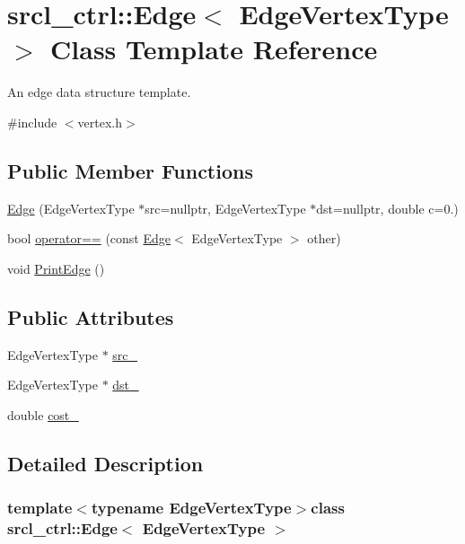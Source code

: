 \hypertarget{classsrcl__ctrl_1_1Edge}{\section{srcl\-\_\-ctrl\-:\-:Edge$<$ Edge\-Vertex\-Type $>$ Class Template Reference}
\label{classsrcl__ctrl_1_1Edge}
}


An edge data structure template.  




{\ttfamily \#include $<$vertex.\-h$>$}

\subsection*{Public Member Functions}
\begin{DoxyCompactItemize}
\item 
\hyperlink{classsrcl__ctrl_1_1Edge_adc7672a9601379eefdf19b87391c4e46}{Edge} (Edge\-Vertex\-Type $\ast$src=nullptr, Edge\-Vertex\-Type $\ast$dst=nullptr, double c=0.)
\item 
bool \hyperlink{classsrcl__ctrl_1_1Edge_aac720de96b34c8df1630a8daf6c1c5f0}{operator==} (const \hyperlink{classsrcl__ctrl_1_1Edge}{Edge}$<$ Edge\-Vertex\-Type $>$ other)
\item 
void \hyperlink{classsrcl__ctrl_1_1Edge_aa4298ece2dc8531478831e9a4264e259}{Print\-Edge} ()
\end{DoxyCompactItemize}
\subsection*{Public Attributes}
\begin{DoxyCompactItemize}
\item 
Edge\-Vertex\-Type $\ast$ \hyperlink{classsrcl__ctrl_1_1Edge_a5bed55147bff722c87024125ce1f9342}{src\-\_\-}
\item 
Edge\-Vertex\-Type $\ast$ \hyperlink{classsrcl__ctrl_1_1Edge_a4056e34b3a064ff9a9b911403c6ea2fc}{dst\-\_\-}
\item 
double \hyperlink{classsrcl__ctrl_1_1Edge_a7371601eee959a3b670aa6417484b871}{cost\-\_\-}
\end{DoxyCompactItemize}


\subsection{Detailed Description}
\subsubsection*{template$<$typename Edge\-Vertex\-Type$>$class srcl\-\_\-ctrl\-::\-Edge$<$ Edge\-Vertex\-Type $>$}

